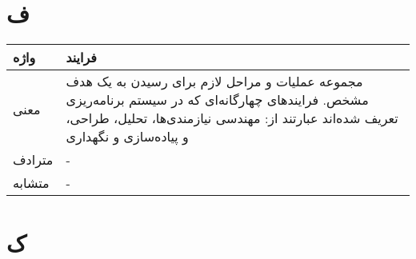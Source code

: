 \section*{ف}%

\begin{table}[H]
	\centering
	\begin{tabular}{| p{1.5cm} | p{5cm} |}
		\hline
		واژه & فرایند \\
		\hline
		معنی  & مجموعه عملیات و مراحل لازم برای رسیدن به یک هدف مشخص.  فرایندهای چهارگانه‌ای که در سیستم برنامه‌ریزی تعریف شده‌اند عبارتند از: مهندسی نیازمندی‌ها، تحلیل، طراحی، و پیاده‌سازی و نگهداری \\
		\hline
		مترادف & - \\
		\hline
		متشابه  & - \\
		\hline
	\end{tabular}
\end{table}

\section*{ک}%

